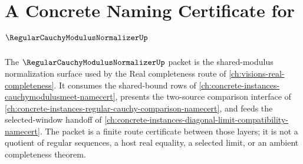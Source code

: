 \chapter{A Concrete Naming Certificate for $\RegularCauchyModulusNormalizerUp$}
\label{ch:concrete-instances-regular-cauchy-modulus-normalizer-namecert}

The $\RegularCauchyModulusNormalizerUp$ packet is the shared-modulus normalization surface used by the Real completeness route of \autoref{ch:visions-real-completeness}. It consumes the shared-bound rows of \autoref{ch:concrete-instances-cauchymodulusmeet-namecert}, presents the two-source comparison interface of \autoref{ch:concrete-instances-regular-cauchy-comparison-namecert}, and feeds the selected-window handoff of \autoref{ch:concrete-instances-diagonal-limit-compatibility-namecert}. The packet is a finite route certificate between those layers; it is not a quotient of regular sequences, a host real equality, a selected limit, or an ambient completeness theorem.

